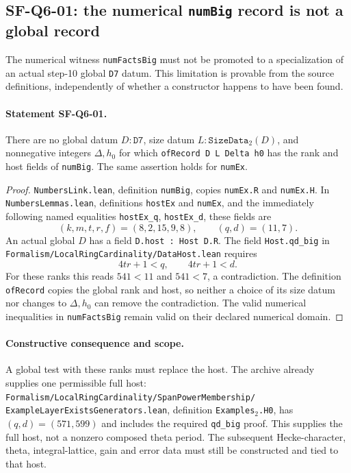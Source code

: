 \subsection{SF-Q6-01: the numerical \texttt{numBig} record is not a global record}

The numerical witness \texttt{numFactsBig} must not be promoted to a
specialization of an actual step-10 global \texttt{D7} datum.
This limitation is provable from the source definitions, independently
of whether a constructor happens to have been found.

\paragraph{Statement SF-Q6-01.}
There are no global datum $D:\texttt{D7}$, size datum
$L:\texttt{SizeData}_{2}(D)$, and nonnegative integers $\Delta,h_0$ for which
\texttt{ofRecord D L Delta h0} has the rank and host fields of
\texttt{numBig}. The same assertion holds for \texttt{numEx}.

\begin{proof}
\texttt{NumbersLink.lean}, definition \texttt{numBig}, copies
\texttt{numEx.R} and \texttt{numEx.H}.  In
\texttt{NumbersLemmas.lean}, definitions \texttt{hostEx} and
\texttt{numEx}, and the immediately following named equalities
\texttt{hostEx\_q}, \texttt{hostEx\_d}, these fields are
\[
 (k,m,t,r,f)=(8,2,15,9,8),\qquad(q,d)=(11,7).
\]
An actual global $D$ has a field
\texttt{D.host : Host D.R}.  The field \texttt{Host.qd\_big} in
\texttt{Formalism/LocalRingCardinality/DataHost.lean} requires
\[
 4tr+1<q,\qquad 4tr+1<d.
\]
For these ranks this reads $541<11$ and $541<7$, a contradiction.
The definition \texttt{ofRecord} copies the global rank and host,
so neither a choice of its size datum nor changes to $\Delta,h_0$
can remove the contradiction.  The valid numerical inequalities in
\texttt{numFactsBig} remain valid on their declared numerical domain.
\end{proof}

\paragraph{Constructive consequence and scope.}
A global test with these ranks must replace the host.  The archive
already supplies one permissible full host:
\texttt{Formalism/LocalRingCardinality/SpanPowerMembership/
ExampleLayerExistsGenerators.lean}, definition \texttt{Examples$_2$.H0},
has $(q,d)=(571,599)$ and includes the required \texttt{qd\_big}
proof. This supplies the full host, not a nonzero composed theta period.
The subsequent Hecke-character, theta, integral-lattice, gain and error
data must still be constructed and tied to that host.

